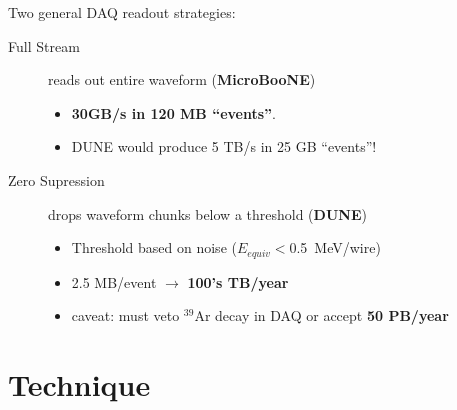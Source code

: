 \documentclass[xcolor=dvipsnames]{beamer}
\begin{document}
\begin{frame}
  \footnotesize
  Two general DAQ readout strategies:
  \begin{description}
  \item[Full Stream] reads out entire waveform (\textbf{MicroBooNE})
    \begin{itemize}
    \item \textbf{30GB/s in 120 MB ``events''}.
    \item DUNE would produce 5 TB/s in 25 GB ``events''!
    \end{itemize}
  \item[Zero Supression] drops waveform chunks below a threshold (\textbf{DUNE})
    \begin{itemize}
    \item Threshold based on noise ($E_{equiv} <$\SI{0.5}{\mega\electronvolt}/wire)
    \item 2.5 MB/event $\rightarrow$ \textbf{100's TB/year}
    \item caveat: must veto $^{39}$Ar decay in DAQ or accept \textbf{50 PB/year}
    \end{itemize}
  \end{description}

\end{frame}


\section{Technique}

\begin{frame}
\end{frame}
\end{document}
